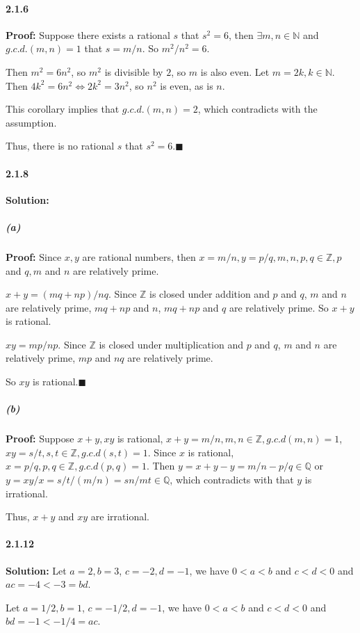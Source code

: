 \documentclass[11pt]{article}
\begin{document}
	\paragraph{2.1.6}\textbf{Proof:}
		Suppose there exists a rational $s$ that $s^2 = 6$, then $\exists m, n \in \mathbb{N}$ and $g.c.d.(m, n) = 1$ that $s = m / n$. So $m^2 / n^2 = 6$. 
		
			Then $m^2 = 6n^2$, so $m^2$ is divisible by $2$, so $m$ is also even. Let $m = 2k, k \in \mathbb{N}$. Then $4k^2 = 6n^2 \Leftrightarrow 2k^2 = 3n^2$, so $n^2$ is even, as is $n$.
			
			This corollary implies that $g.c.d.(m, n) = 2$, which contradicts with the assumption.
			
			Thus, there is no rational $s$ that $s^2 = 6$.$\blacksquare$
	\paragraph{2.1.8}\textbf{Solution:}
		\subparagraph{(a)}\textbf{Proof:}
			Since $x, y$ are rational numbers, then $x = m / n, y = p / q, m, n, p, q \in \mathbb{Z}, p$ and $q, m$ and $n$ are relatively prime. 
			
			$x + y = (mq + np) / nq$. Since $\mathbb{Z}$ is closed under addition and $p$ and $q$, $m$ and $n$ are relatively prime,  $mq + np$ and $n$, $mq + np$ and $q$ are relatively prime. So $x + y$ is rational.
			
			$xy = mp / np$. Since $\mathbb{Z}$ is closed under multiplication and $p$ and $q$, $m$ and $n$ are relatively prime, $mp$ and $nq$ are relatively prime.
			
			So $xy$ is rational.$\blacksquare$
		\subparagraph{(b)}\textbf{Proof:}
			Suppose $x + y, xy$ is rational, $x + y = m / n, m, n \in \mathbb{Z}, g.c.d(m, n) = 1$, $xy = s / t, s, t \in \mathbb{Z}, g.c.d(s, t) = 1$. Since $x$ is rational, $x = p / q, p, q \in \mathbb{Z}, g.c.d(p, q) = 1$. Then $y = x + y - y = m / n - p / q \in \mathbb{Q}$ or $y = xy / x = s / t / (m / n) = sn / mt \in \mathbb{Q}$, which contradicts with that $y$ is irrational.
			
			Thus, $x + y$ and $xy$ are irrational.
	\paragraph{2.1.12}\textbf{Solution:}
		Let $a = 2, b = 3$, $c = -2, d = -1$, we have $0 < a < b$ and $c < d < 0$ and $ac = -4 < -3 = bd$.
			
			Let $a = 1/2, b = 1$, $c = -1/2, d = -1$, we have $0 < a < b$ and $c < d < 0$ and $bd = -1 < -1/4 = ac$. 
\end{document}
